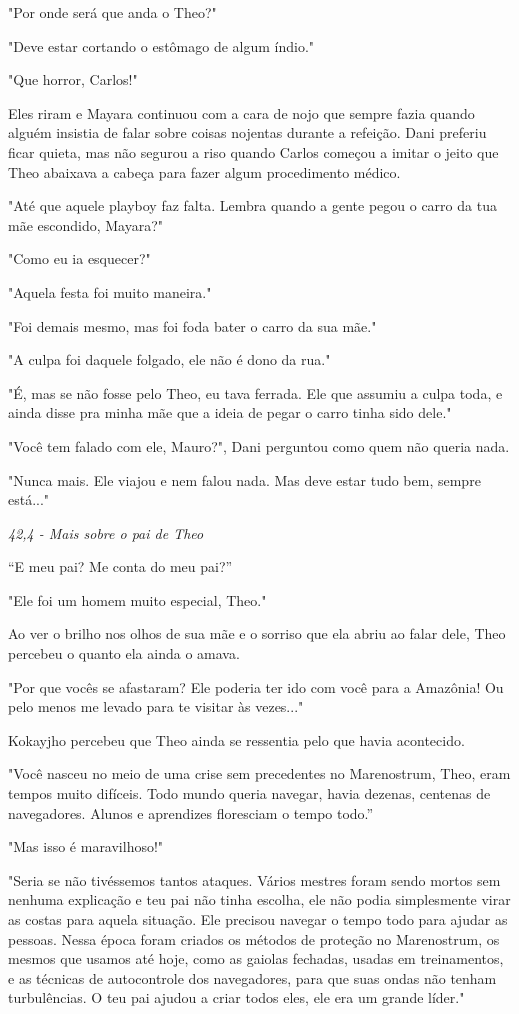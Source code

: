 "Por onde será que anda o Theo?"

"Deve estar cortando o estômago de algum índio."

"Que horror, Carlos!"

Eles riram e Mayara continuou com a cara de nojo que sempre fazia quando
alguém insistia de falar sobre coisas nojentas durante a refeição. Dani
preferiu ficar quieta, mas não segurou a riso quando Carlos começou a
imitar o jeito que Theo abaixava a cabeça para fazer algum procedimento
médico.

"Até que aquele playboy faz falta. Lembra quando a gente pegou o carro
da tua mãe escondido, Mayara?"

"Como eu ia esquecer?"

"Aquela festa foi muito maneira."

"Foi demais mesmo, mas foi foda bater o carro da sua mãe."

"A culpa foi daquele folgado, ele não é dono da rua."

"É, mas se não fosse pelo Theo, eu tava ferrada. Ele que assumiu a culpa
toda, e ainda disse pra minha mãe que a ideia de pegar o carro tinha
sido dele."

"Você tem falado com ele, Mauro?", Dani perguntou como quem não queria
nada.

"Nunca mais. Ele viajou e nem falou nada. Mas deve estar tudo bem,
sempre está..."

\asterisc

\emph{42,4 - Mais sobre o pai de Theo}

``E meu pai? Me conta do meu pai?''

"Ele foi um homem muito especial, Theo."

Ao ver o brilho nos olhos de sua mãe e o sorriso que ela abriu ao falar
dele, Theo percebeu o quanto ela ainda o amava.

"Por que vocês se afastaram? Ele poderia ter ido com você para a
Amazônia! Ou pelo menos me levado para te visitar às vezes..."

Kokayjho percebeu que Theo ainda se ressentia pelo que havia acontecido.

"Você nasceu no meio de uma crise sem precedentes no Marenostrum, Theo,
eram tempos muito difíceis. Todo mundo queria navegar, havia dezenas,
centenas de navegadores. Alunos e aprendizes floresciam o tempo todo.''

"Mas isso é maravilhoso!"

"Seria se não tivéssemos tantos ataques. Vários mestres foram sendo
mortos sem nenhuma explicação e teu pai não tinha escolha, ele não podia
simplesmente virar as costas para aquela situação. Ele precisou navegar
o tempo todo para ajudar as pessoas. Nessa época foram criados os
métodos de proteção no Marenostrum, os mesmos que usamos até hoje, como
as gaiolas fechadas, usadas em treinamentos, e as técnicas de
autocontrole dos navegadores, para que suas ondas não tenham
turbulências. O teu pai ajudou a criar todos eles, ele era um grande
líder."

